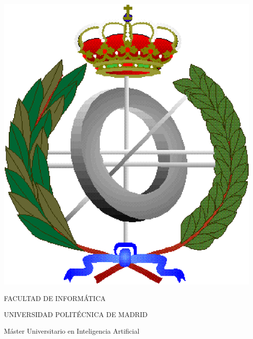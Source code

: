 \begin{titlepage}

\begin{center}
\includegraphics[scale=0.2]{facultad.eps}
\par\end{center}


\begin{center}
{\Large FACULTAD DE INFORMÁTICA}
\par\end{center}{\Large \par}

\begin{center}
{\Large UNIVERSIDAD POLITÉCNICA DE MADRID}
\par\end{center}{\Large \par}

{\Large \vspace{2cm}
}{\Large \par}

\begin{center}
{\Large Máster Universitario en Inteligencia Artificial}
\par\end{center}{\Large \par}


\end{titlepage}
